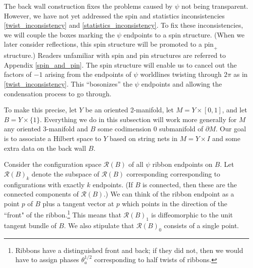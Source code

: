 \documentclass[12pt,a4paper]{article}
\newcommand{\mcr}{\mathcal{R}}
\newcommand{\bd}{\partial}
\newcommand{\kw}[1]{{\color{kwcolor}\footnotesize{(KW) #1}}}
\begin{document}
The back wall construction fixes the problems caused by $\psi$ not being transparent.
However, we have not yet addressed the spin and statistics inconsistencies \eqref{twist_inconsistency} and \eqref{statistics_inconsistency}.
To fix these inconsistencies, we will couple the boxes marking the $\psi$ endpoints to a spin structure. 
(When we later consider reflections, this spin structure will be promoted to a $\mbox{pin}_+$ structure.)
Readers unfamiliar with spin and pin structures are referred to Appendix \ref{spin_and_pin}. 
The spin structure will enable us to cancel out the factors of $-1$ 
arising from the endpoints of $\psi$ worldlines twisting through $2\pi$ as in \eqref{twist_inconsistency}.
This ``bosonizes'' the $\psi$ endpoints and allowing the condensation process to go through. 


\medskip

To make this precise, let $Y$ be an oriented 2-manifold, let $M = Y\times [0,1]$, and let $B = Y\times \{1\}$.
Everything we do in this subsection will work more generally for $M$ any oriented 
3-manifold and $B$ some codimension 0 submanifold
of $\bd M$.
Our goal is to associate a Hilbert space to $Y$ based on string nets in $M = Y\times I$
and some extra data on the back wall $B$.

Consider the configuration space $\mcr(B)$ of all $\psi$ ribbon endpoints on $B$.
Let $\mcr(B)_k$ denote the subspace of $\mcr(B)$ corresponding corresponding to configurations with exactly $k$ endpoints.
(If $B$ is connected, then these are the connected components of $\mcr(B)$.)
We can think of the ribbon endpoint as a point $p$ of $B$ plus a tangent vector at $p$ which
points in the direction of the ``front" of the ribbon.\footnote{Ribbons 
have a distinguished front and back; if they did not, then we would have to assign
phases $\theta_a^{1/2}$ corresponding to half twists of ribbons.}
This means that $\mcr(B)_1$ is diffeomorphic to the unit tangent bundle of $B$.
We also stipulate that $\mcr(B)_0$ consists of a single point.
\end{document}
